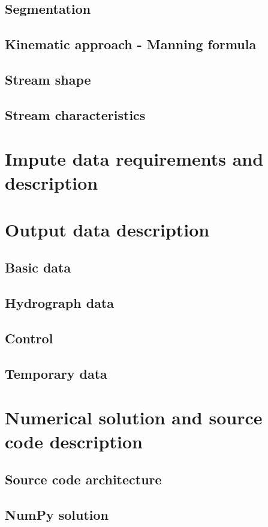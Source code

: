     \subsection{Segmentation}
    \subsection{Kinematic approach - Manning formula}
    \subsection{Stream shape}
    \subsection{Stream characteristics}

\section{Impute data requirements and description}

\section{Output data description}

    \subsection{Basic data}
    \subsection{Hydrograph data}
    \subsection{Control}
    \subsection{Temporary data}

\section{Numerical solution and source code description}

    \subsection{Source code architecture}
    \subsection{NumPy solution}
